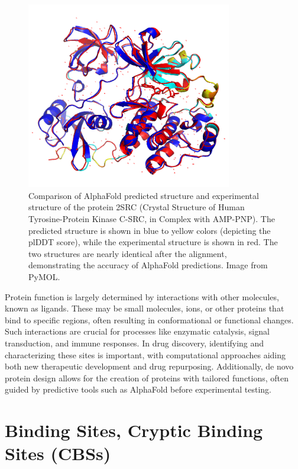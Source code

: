 \begin{figure}[ht]
    \centering
    \includegraphics[width=0.8\textwidth]{img/alphafold_vs_exp.png}
    \caption{Comparison of AlphaFold predicted structure and experimental structure of the protein 2SRC (Crystal Structure of Human Tyrosine-Protein Kinase C-SRC, in Complex with AMP-PNP). The predicted structure is shown in blue to yellow colors (depicting the plDDT score), while the experimental structure is shown in red. The two structures are nearly identical after the alignment, demonstrating the accuracy of AlphaFold predictions. Image from PyMOL.}
    \label{fig:alphafold-vs-exp}
\end{figure}
\par

Protein function is largely determined by interactions with other molecules, known as ligands. These may be small molecules, ions, or other proteins that bind to specific regions, often resulting in conformational or functional changes. Such interactions are crucial for processes like enzymatic catalysis, signal transduction, and immune responses. In drug discovery, identifying and characterizing these sites is important, with computational approaches aiding both new therapeutic development and drug repurposing. Additionally, de novo protein design allows for the creation of proteins with tailored functions, often guided by predictive tools such as AlphaFold before experimental testing. \cite{huang2016coming}

\section{Binding Sites, Cryptic Binding Sites (CBSs)}
\label{sec:binding-sites}

